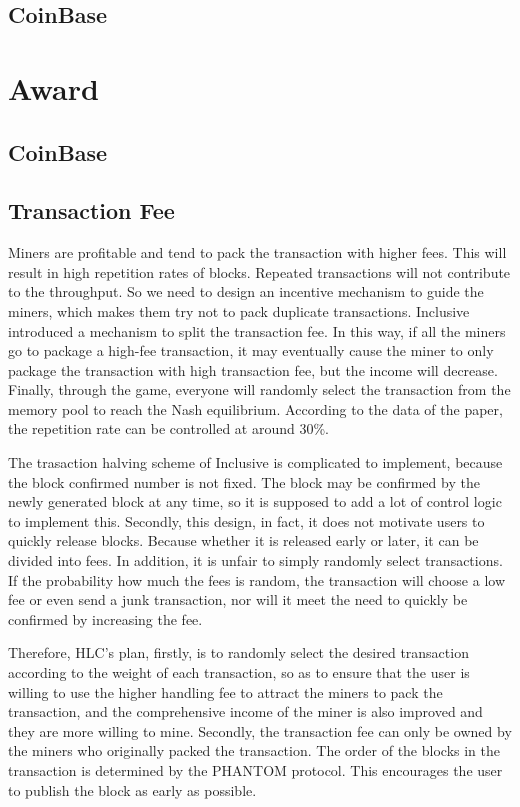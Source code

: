 \documentclass[a4paper,11pt]{article}
\begin{document}
\subsection{CoinBase}

\section{Award}
\subsection{CoinBase}
\subsection{Transaction Fee}

Miners are profitable and tend to pack the transaction with higher fees. This will result in high repetition rates of blocks. Repeated transactions will not contribute to the throughput. So we need to design an incentive mechanism to guide the miners, which makes them try not to pack duplicate transactions. Inclusive introduced a mechanism to split the transaction fee. In this way, if all the miners go to package a high-fee transaction, it may eventually cause the miner to only package the transaction with high transaction fee, but the income will decrease. Finally, through the game, everyone will randomly select the transaction from the memory pool to reach the Nash equilibrium. According to the data of the paper, the repetition rate can be controlled at around 30\%.

The trasaction halving scheme of Inclusive is complicated to implement, because the block confirmed number is not fixed. The block may be confirmed by the newly generated block at any time, so it is supposed to add a lot of control logic to implement this. Secondly, this design, in fact, it does not motivate users to quickly release blocks. Because whether it is released early or later, it can be divided into fees. In addition, it is unfair to simply randomly select transactions. If the probability how much the fees is random, the transaction will choose a low fee or even send a junk transaction, nor will it meet the need to quickly be confirmed by increasing the fee.

Therefore, HLC's plan, firstly, is to randomly select the desired transaction according to the weight of each transaction, so as to ensure that the user is willing to use the higher handling fee to attract the miners to pack the transaction, and the comprehensive income of the miner is also improved and they are more willing to mine. Secondly, the transaction fee can only be owned by the miners who originally packed the transaction. The order of the blocks in the transaction is determined by the PHANTOM protocol. This encourages the user to publish the block as early as possible.
\end{document}
